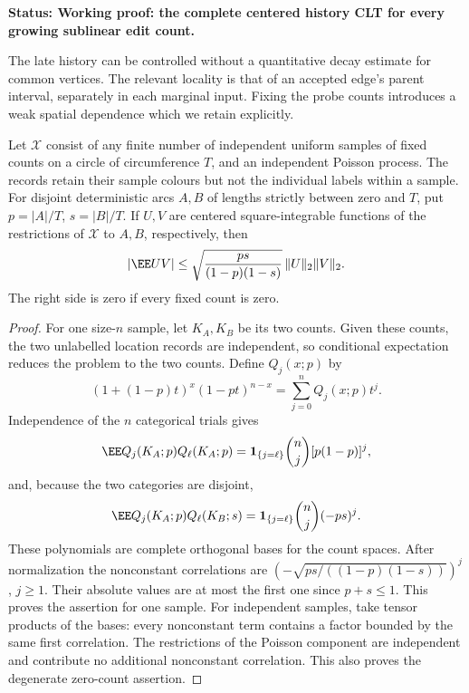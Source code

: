 \documentclass[11pt,letterpaper]{article}
\newcommand{\ind}{\mathbf 1}\newcommand{\Exp}{\operatorname{Exp}}
\newcommand{\status}[1]{\textbf{Status: #1.}}
\begin{document}
\status{Working proof: the complete centered history CLT for every growing sublinear edit count}

The late history can be controlled without a quantitative decay
estimate for common vertices. The relevant locality is that of an
accepted edge's parent interval, separately in each marginal input.
Fixing the probe counts introduces a weak spatial dependence which
we retain explicitly.

\begin{lemma}
\label{lem:binomial-restriction-correlation}
Let $\mathcal X$ consist of any finite number of independent
uniform samples of fixed counts on a circle of circumference $T$,
and an independent Poisson process. The records retain their sample
colours but not the individual labels within a sample.
For disjoint deterministic arcs $A,B$ of lengths strictly between
zero and $T$, put $p=|A|/T$, $s=|B|/T$.
If $U,V$ are centered square-integrable functions of the restrictions
of $\mathcal X$ to $A,B$, respectively, then
\begin{equation}\label{eq:binomial-restriction-correlation}
 |\EE UV|\le
 \sqrt{\frac{ps}{(1-p)(1-s)}}\,\|U\|_2\|V\|_2.
\end{equation}
The right side is zero if every fixed count is zero.
\end{lemma}
\begin{proof}
For one size-$n$ sample, let $K_A,K_B$ be its two counts.
Given these counts, the two unlabelled location records are
independent, so conditional expectation reduces the problem
to the two counts. Define $Q_j(x;p)$ by
\[
 (1+(1-p)t)^x(1-pt)^{n-x}
       =\sum_{j=0}^n Q_j(x;p)t^j.
\]
Independence of the $n$ categorical trials gives
\[
 \EE Q_j(K_A;p)Q_\ell(K_A;p)
   =\ind_{\{j=\ell\}}\binom nj[p(1-p)]^j,
\]
and, because the two categories are disjoint,
\[
 \EE Q_j(K_A;p)Q_\ell(K_B;s)
   =\ind_{\{j=\ell\}}\binom nj(-ps)^j.
\]
These polynomials are complete orthogonal bases for the count
spaces. After normalization the nonconstant correlations are
$(-\sqrt{ps/((1-p)(1-s))})^j$, $j\ge1$.
Their absolute values are at most the first one since $p+s\le1$.
This proves the assertion for one sample. For independent
samples, take tensor products of the bases: every nonconstant
term contains a factor bounded by the same first correlation.
The restrictions of the Poisson component are independent and
contribute no additional nonconstant correlation. This also
proves the degenerate zero-count assertion.
\end{proof}
\end{document}
